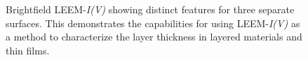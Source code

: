 \begin{figure}
\centering


  \caption{Brightfield LEEM-\textit{I(V)} showing distinct features for three separate surfaces. This demonstrates the capabilities for using LEEM-\textit{I(V)} as a method to characterize the layer thickness in layered materials and thin films.
  }
  \label{fig:LayerThickness}
\end{figure}

